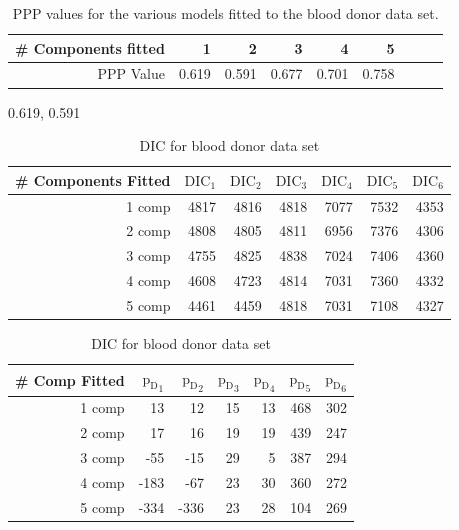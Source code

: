 \begin{table}[!htb]
\centering
\captionsetup{justification=centering}
\caption{PPP values for the various models fitted to the blood donor data set.}
\label{table : ppp_value_5welsepcomp}
\begin{tabular}{@{}rrrrrrrrr@{}}
\toprule
\# Components fitted & 1 & 2 & 3 & 4 & 5\\ \midrule
PPP Value & 0.619 & 0.591 & 0.677 & 0.701 & 0.758\\ \bottomrule
\end{tabular}
\end{table}
0.619, 0.591

\begin{table}[!htb]
\centering
\captionsetup{justification=centering}
\caption{DIC for blood donor data set}
\label{table : dic_blood_donor}
\begin{tabular}{@{}rrrrrrr@{}}
\toprule
\# Components Fitted & $\text{DIC}_1$ & $\text{DIC}_2$ & $\text{DIC}_3$  & $\text{DIC}_4$  & $\text{DIC}_5$  & $\text{DIC}_6$  \\ \midrule
1 comp & 4817 & 4816 & 4818 & 7077 & 7532 & 4353 \\
2 comp & 4808 & 4805 & 4811 & 6956 & 7376 & 4306 \\
3 comp & 4755 & 4825 & 4838 & 7024 & 7406 & 4360 \\
4 comp & 4608 & 4723 & 4814 & 7031 & 7360 & 4332 \\
5 comp & 4461 & 4459 & 4818 & 7031 & 7108 & 4327 \\ \bottomrule
\end{tabular}
\begin{tabular}{@{}rrrrrrr@{}}
\toprule
\# Comp Fitted & ${\text{p}_\text{D}}_1$ & ${\text{p}_\text{D}}_2$ & ${\text{p}_\text{D}}_3$ & ${\text{p}_\text{D}}_4$ & ${\text{p}_\text{D}}_5$ & ${\text{p}_\text{D}}_6$ \\ \midrule
1 comp & 13 & 12 & 15 & 13 & 468 & 302 \\
2 comp & 17 & 16 & 19 & 19 & 439 & 247 \\
3 comp & -55 & -15 & 29 & 5 & 387 & 294 \\
4 comp & -183 & -67 & 23 & 30 & 360 & 272 \\
5 comp & -334 & -336 & 23 & 28 & 104 & 269 \\ \bottomrule
\end{tabular}
\end{table}

